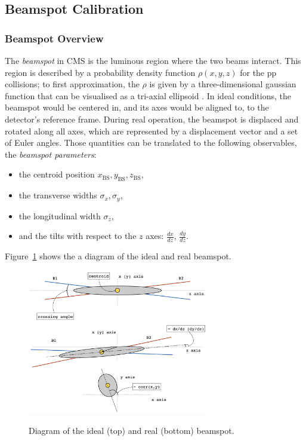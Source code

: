 \subsection{Beamspot Calibration}

\subsubsection{Beamspot Overview}

The \emph{beamspot} in CMS is the luminous region where the two beams interact.
This region is described by a probability density function $\rho(x,y,z)$ for the pp collisions;
to first approximation, the $\rho$ is given by a three-dimensional gaussian function that can be visualised as a tri-axial ellipsoid \cite{CMS-PAS-TRK-10-005}.
In ideal conditions, the beamspot would be centered in,
and its axes would be aligned to,
to the detector's reference frame.
During real operation, the beamspot is displaced and rotated along all axes,
which are represented by a displacement vector and a set of Euler angles.
Those quantities can be translated to the following observables, the \emph{beamspot parameters}:
\begin{itemize}
\item the centroid position $x_{\text{BS}}, y_{\text{BS}}, z_{\text{BS}}$,
\item the transverse widths $\sigma_{x}, \sigma_{y}$,
\item the longitudinal width $\sigma_{z}$,
\item and the tilts with respect to the $z$ axes: $\frac{dx}{dz}$, $\frac{dy}{dz}$.
\end{itemize}
Figure~\ref{fig:beamspotCartoon} shows the a diagram of the ideal and real beamspot.
\begin{figure}[htbp]
   \centering
\includegraphics[width=0.7\textwidth]{figures/IdealBeamspot.png}\\[3ex]
\includegraphics[width=0.7\textwidth]{figures/RealBeamspot.png}
   \caption{Diagram of the ideal (top) and real (bottom) beamspot.}
   \label{fig:beamspotCartoon}
\end{figure}

